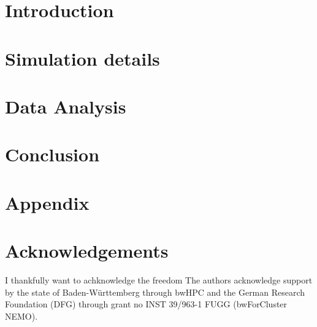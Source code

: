 \documentclass[a4paper, twoside, 11pt]{scrreprt}
\begin{document}



\renewcommand{\chapterpagestyle}{plain}

\tableofcontents 
\newpage

\listoffigures
\newpage

\listoftables
\newpage

\null\thispagestyle{empty}  %
\newpage


\pagestyle{scrheadings} %



\chapter{Introduction}

\newpage

\chapter{Simulation details}

\newpage

\chapter{Data Analysis}

\newpage

\chapter{Conclusion}

\newpage

\pagestyle{plain}
\renewcommand{\chapterpagestyle}{plain}
\chapter{Appendix}

\newpage

\chapter*{Acknowledgements}%

I thankfully want to achknowledge the freedom
The authors acknowledge support by the state of Baden-Württemberg through bwHPC
and the German Research Foundation (DFG) through grant no INST 39/963-1 FUGG (bwForCluster NEMO).
\end{document}
